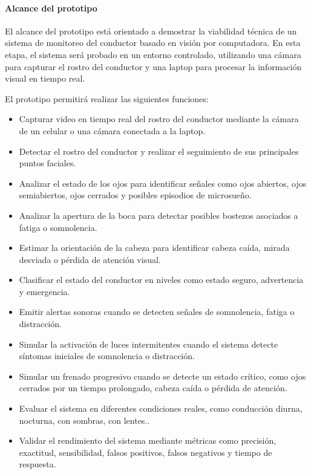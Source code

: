 \documentclass[conference]{IEEEtran}
\begin{document}
\paragraph{Alcance del prototipo}

El alcance del prototipo está orientado a demostrar la viabilidad técnica de un sistema de monitoreo del conductor basado en visión por computadora. En esta etapa, el sistema será probado en un entorno controlado, utilizando una cámara para capturar el rostro del conductor y una laptop para procesar la información visual en tiempo real.

El prototipo permitirá realizar las siguientes funciones:

\begin{itemize}
    \item Capturar video en tiempo real del rostro del conductor mediante la cámara de un celular o una cámara conectada a la laptop.
    
    \item Detectar el rostro del conductor y realizar el seguimiento de sus principales puntos faciales.
    
    \item Analizar el estado de los ojos para identificar señales como ojos abiertos, ojos semiabiertos, ojos cerrados y posibles episodios de microsueño.
    
    \item Analizar la apertura de la boca para detectar posibles bostezos asociados a fatiga o somnolencia.
    
    \item Estimar la orientación de la cabeza para identificar cabeza caída, mirada desviada o pérdida de atención visual.
    
    \item Clasificar el estado del conductor en niveles como estado seguro, advertencia y emergencia.
    
    \item Emitir alertas sonoras cuando se detecten señales de somnolencia, fatiga o distracción.
    
    \item Simular la activación de luces intermitentes cuando el sistema detecte síntomas iniciales de somnolencia o distracción.
    
    \item Simular un frenado progresivo cuando se detecte un estado crítico, como ojos cerrados por un tiempo prolongado, cabeza caída o pérdida de atención.

    \item Evaluar el sistema en diferentes condiciones reales, como conducción diurna, nocturna, con sombras, con lentes..
    
    \item Validar el rendimiento del sistema mediante métricas como precisión, exactitud, sensibilidad, falsos positivos, falsos negativos y tiempo de respuesta.
    
\end{itemize}
\end{document}
